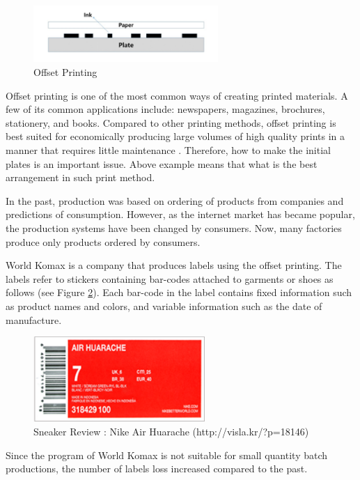 \begin{figure}[h!]
	\centering
	\includegraphics[width=7cm]{OffsetPrint.pdf}
	\caption{Offset Printing}
	\label{fig:OffsetPrint}
\end{figure}

Offset printing is one of the most common ways of creating printed materials. A few of its common applications include: newspapers, magazines, brochures, stationery, and books. Compared to other printing methods, offset printing is best suited for economically producing large volumes of high quality prints in a manner that requires little maintenance \cite{Kipphan2001}. Therefore, how to make the initial plates is an important issue. Above example means that what is the best arrangement in such print method.

In the past, production was based on ordering of products from companies and predictions of consumption. 
However, as the internet market has became popular, the production systems have been changed by consumers. 
Now, many factories produce only products ordered by consumers.

World Komax is a company that produces labels using the offset printing. The labels refer to stickers containing bar-codes attached to garments or shoes as follows (see Figure \ref{fig:AirHuarache}). Each bar-code in the label contains fixed information such as product names and colors, and variable information such as the date of manufacture.

\begin{figure}[h!]
	\centering
	\includegraphics[width=6.5cm]{AirHuarache.pdf}
	\caption{Sneaker Review : Nike Air Huarache (http://visla.kr/?p=18146)}
	\label{fig:AirHuarache}       %
\end{figure}

\noindent
Since the program of World Komax is not suitable for small quantity batch productions, the number of labels loss increased compared to the past.

